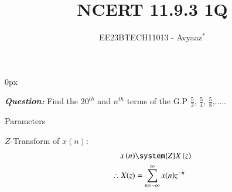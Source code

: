 \documentclass[journal,12pt,twocolumn]{IEEEtran}
\theoremstyle{remark}
\begin{document}
\parindent 0px

\vspace{3cm}

\title{NCERT 11.9.3 1Q}
\author{EE23BTECH11013 - Avyaaz$^{*}$%
}
\maketitle
\newpage
\bigskip

\renewcommand{\thefigure}{\arabic{figure}}
\renewcommand{\thetable}{\arabic{table}}
\large\textbf{\textsl{Question:}}
Find the $20^{th}$ and $n^{th}$ terms of the G.P $\frac{5}{2}$, $\frac{5}{4}$, $\frac{5}{8}$,.....

\solution
 \begin{table}[htbp]
     \centering
     \setlength{\extrarowheight}{8pt}
    
     \caption{Parameters}
     \label{tab:table1}
 \end{table} 

\(Z\)-Transform of \(x(n)\):
\begin{align}
	x \brak{n} & \system{Z} X \brak{z} \\
    \therefore X(z) &= \sum_{n=-\infty}^{\infty}x(n)z^{-n}\label{eq:z-transform}  
\end{align}
 
\end{document}
